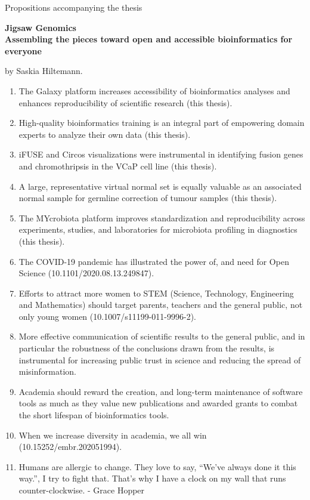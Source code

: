 \begin{center}
Propositions accompanying the thesis

\textbf{Jigsaw Genomics \ \\Assembling the pieces toward open and accessible bioinformatics for everyone}

by Saskia Hiltemann.
\end{center}



\begin{enumerate}
\item The Galaxy platform increases accessibility of bioinformatics analyses and enhances reproducibility of scientific research (this thesis).
\item High-quality bioinformatics training is an integral part of empowering domain experts to analyze their own data (this thesis).
\item iFUSE and Circos visualizations were instrumental in identifying fusion genes and chromothripsis in the VCaP cell line (this thesis).
\item A large, representative virtual normal set is equally valuable as an associated normal sample for germline correction of tumour samples (this thesis).
\item The MYcrobiota platform improves standardization and reproducibility across experiments, studies, and laboratories for microbiota profiling in diagnostics (this thesis).
\item The COVID-19 pandemic has illustrated the power of, and need for Open Science (10.1101/2020.08.13.249847).
\item Efforts to attract more women to STEM (Science, Technology, Engineering and Mathematics) should target parents, teachers and the general public, not only young women (10.1007/s11199-011-9996-2).
\item More effective communication of scientific results to the general public, and in particular the robustness of the conclusions drawn from the results, is instrumental for increasing public trust in science and reducing the spread of misinformation.
\item Academia should reward the creation, and long-term maintenance of software tools as much as they value new publications and awarded grants to combat the short lifespan of bioinformatics tools.
\item When we increase diversity in academia, we all win (10.15252/embr.202051994).
\item Humans are allergic to change. They love to say, ``We've always done it this way.'', I try to fight that. That's why I have a clock on my wall that runs counter-clockwise. - Grace Hopper
\end{enumerate}
